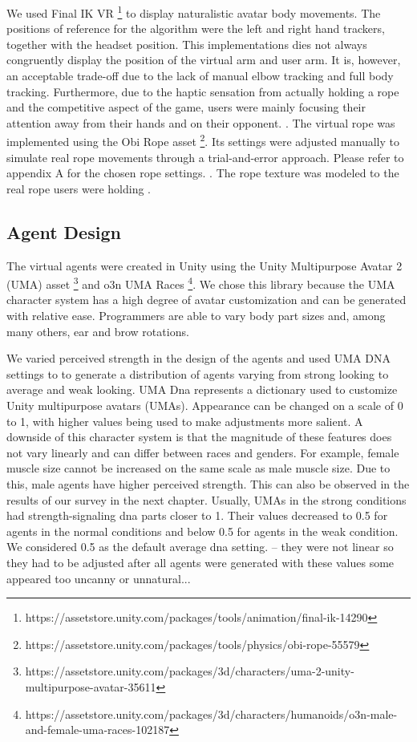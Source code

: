 We used Final IK VR \footnote{https://assetstore.unity.com/packages/tools/animation/final-ik-14290} to display naturalistic avatar body movements. The positions of reference for the algorithm were the left and right hand trackers, together with the headset position. 
This implementations dies not always congruently display the position of the virtual arm and user arm. It is, however, an acceptable trade-off due to the lack of manual elbow tracking and full body tracking. Furthermore, due to the haptic sensation from actually holding a rope and the competitive aspect of the game, users were mainly focusing their attention away from their hands and on their opponent. .
The virtual rope was implemented using the Obi Rope asset \footnote{https://assetstore.unity.com/packages/tools/physics/obi-rope-55579}. Its settings were adjusted manually to simulate real rope movements through a trial-and-error approach. Please refer to appendix A for the chosen rope settings. . The rope texture was modeled to the real rope users were holding . 

\subsection{Agent Design}

The virtual agents were created in Unity using the Unity Multipurpose Avatar 2 (UMA) asset \footnote{https://assetstore.unity.com/packages/3d/characters/uma-2-unity-multipurpose-avatar-35611} and o3n UMA Races \footnote{https://assetstore.unity.com/packages/3d/characters/humanoids/o3n-male-and-female-uma-races-102187}. We chose this library because the UMA character system has a high degree of avatar customization and can be generated with relative ease. Programmers are able to vary body part sizes and, among many others, ear and brow rotations. 

We varied perceived strength in the design of the agents and used UMA DNA settings to to generate a distribution of agents varying from strong looking to average and weak looking. UMA Dna represents a dictionary used to customize Unity multipurpose avatars (UMAs). Appearance can be changed on a scale of 0 to 1, with higher values being used to make adjustments more salient. A downside of this character system is that the magnitude of these features does not vary linearly and can differ between races and genders. For example, female muscle size cannot be increased on the same scale as male muscle size. Due to this, male agents have higher perceived strength. This can also be observed in the results of our survey in the next chapter. Usually, UMAs in the strong conditions had strength-signaling dna parts closer to 1. Their values decreased to 0.5 for agents in the normal conditions and below 0.5 for agents in the weak condition. We considered 0.5 as the default average dna setting. -- they were not linear so they had to be adjusted after all agents were generated with these values some appeared too uncanny or unnatural...



